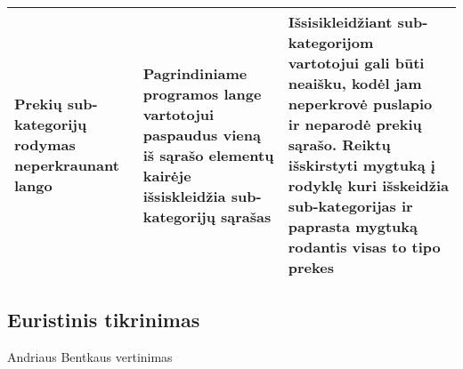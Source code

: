 \documentclass[oneside]{VUMIFPSkursinis}
\begin{document}
\begin{center}
\begin{tabular}{ |p{4cm}| p{6cm} | p{7cm} | }
	Prekių sub-kategorijų rodymas neperkraunant lango & Pagrindiniame programos lange vartotojui paspaudus vieną iš sąrašo elementų kairėje išsiskleidžia sub-kategorijų sąrašas & Išsisikleidžiant sub-kategorijom vartotojui gali būti neaišku, kodėl jam neperkrovė puslapio ir neparodė prekių sąrašo. Reiktų išskirstyti mygtuką į rodyklę kuri išskeidžia sub-kategorijas ir paprasta mygtuką rodantis visas to tipo prekes \\ \hline

   \hline
    \end{tabular}
\end{center}

	\subsection{Euristinis tikrinimas}
Andriaus Bentkaus vertinimas
\end{document}
